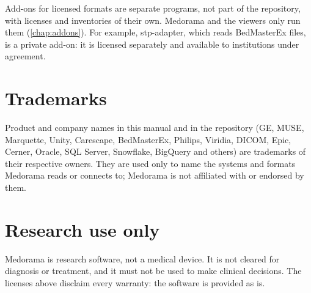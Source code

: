 Add-ons for licensed formats are separate programs, not part of the repository, with licenses and
inventories of their own. Medorama and the viewers only run them (\cref{chap:addons}). For
example, stp-adapter, which reads BedMasterEx  files, is a private add-on: it is
licensed separately and available to institutions under agreement.

\section{Trademarks}
\label{sec:licences-trademarks}

Product and company names in this manual and in the repository (GE, MUSE, Marquette, Unity,
Carescape, BedMasterEx, Philips, Viridia, DICOM, Epic, Cerner, Oracle, SQL Server, Snowflake,
BigQuery and others) are trademarks of their respective owners. They are used only to name the
systems and formats Medorama reads or connects to; Medorama is not affiliated with or endorsed by
them.

\section{Research use only}
\label{sec:licences-research}

Medorama is research software, not a medical device. It is not cleared for diagnosis or
treatment, and it must not be used to make clinical decisions. The licenses above disclaim every
warranty: the software is provided as is.
